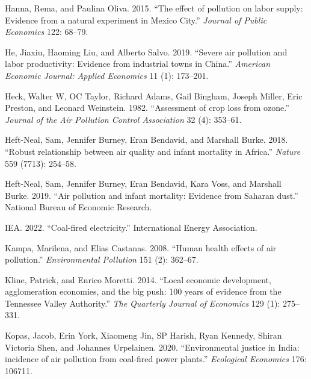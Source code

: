 \documentclass[
]{article}
\newlength{\cslhangindent}
\newlength{\cslentryspacingunit} %
\newenvironment{CSLReferences}[2] %
 {%
  \setlength{\parindent}{0pt}
  \ifodd #1
  \let\oldpar\par
  \def\par{\hangindent=\cslhangindent\oldpar}
  \fi
  \setlength{\parskip}{#2\cslentryspacingunit}
 }%
 {}
\begin{document}
\begin{CSLReferences}{1}{0}
\leavevmode{}%
Hanna, Rema, and Paulina Oliva. 2015. {``{The effect of pollution on labor supply: Evidence from a natural experiment in Mexico City}.''} \emph{{Journal of Public Economics}} 122: 68--79.

\leavevmode{}%
He, Jiaxiu, Haoming Liu, and Alberto Salvo. 2019. {``{Severe air pollution and labor productivity: Evidence from industrial towns in China}.''} \emph{{American Economic Journal: Applied Economics}} 11 (1): 173--201.

\leavevmode{}%
Heck, Walter W, OC Taylor, Richard Adams, Gail Bingham, Joseph Miller, Eric Preston, and Leonard Weinstein. 1982. {``{Assessment of crop loss from ozone}.''} \emph{{Journal of the Air Pollution Control Association}} 32 (4): 353--61.

\leavevmode{}%
Heft-Neal, Sam, Jennifer Burney, Eran Bendavid, and Marshall Burke. 2018. {``{Robust relationship between air quality and infant mortality in Africa}.''} \emph{Nature} 559 (7713): 254--58.

\leavevmode{}%
Heft-Neal, Sam, Jennifer Burney, Eran Bendavid, Kara Voss, and Marshall Burke. 2019. {``{Air pollution and infant mortality: Evidence from Saharan dust}.''} {National Bureau of Economic Research}.

\leavevmode{}%
IEA. 2022. {``{Coal-fired electricity}.''} {International Energy Association}.

\leavevmode{}%
Kampa, Marilena, and Elias Castanas. 2008. {``{Human health effects of air pollution}.''} \emph{{Environmental Pollution}} 151 (2): 362--67.

\leavevmode{}%
Kline, Patrick, and Enrico Moretti. 2014. {``{Local economic development, agglomeration economies, and the big push: 100 years of evidence from the Tennessee Valley Authority}.''} \emph{The Quarterly Journal of Economics} 129 (1): 275--331.

\leavevmode{}%
Kopas, Jacob, Erin York, Xiaomeng Jin, SP Harish, Ryan Kennedy, Shiran Victoria Shen, and Johannes Urpelainen. 2020. {``{Environmental justice in India: incidence of air pollution from coal-fired power plants}.''} \emph{{Ecological Economics}} 176: 106711.


\end{CSLReferences}
\end{document}
